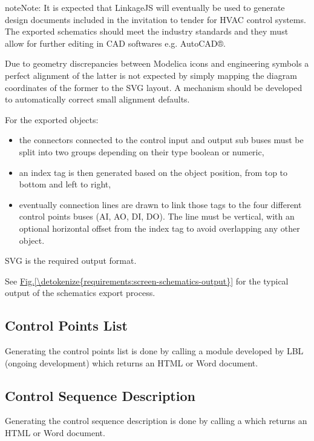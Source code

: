 \documentclass[letterpaper,10pt, openany,english]{sphinxmanual}
\begin{document}
\begin{sphinxadmonition}{note}{Note:}
It is expected that LinkageJS will eventually be used to generate design documents included in the invitation to tender for HVAC control systems. The exported schematics should meet the industry standards and they must allow for further editing in CAD softwares e.g. AutoCAD®.

Due to geometry discrepancies between Modelica icons and engineering symbols a perfect alignment of the latter is not expected by simply mapping the diagram coordinates of the former to the SVG layout. A mechanism should be developed to automatically correct small alignment defaults.
\end{sphinxadmonition}

For the exported objects:
\begin{itemize}
\item {} 
the connectors connected to the control input and output sub buses must be split into two groups depending on their type \textendash{} boolean or numeric,

\item {} 
an index tag is then generated based on the object position, from top to bottom and left to right,

\item {} 
eventually connection lines are drawn to link those tags to the four different control points buses (AI, AO, DI, DO). The line must be vertical, with an optional horizontal offset from the index tag to avoid overlapping any other object.

\end{itemize}

SVG is the required output format.

See \hyperref[\detokenize{requirements:screen-schematics-output}]{Fig.\@ \ref{\detokenize{requirements:screen-schematics-output}}} for the typical output of the schematics export process.


\subsection{Control Points List}
\label{\detokenize{requirements:control-points-list}}
Generating the control points list is done by calling a module developed by LBL (ongoing development) which returns an HTML or Word document.


\subsection{Control Sequence Description}
\label{\detokenize{requirements:control-sequence-description}}
Generating the control sequence description is done by calling a  which returns an HTML or Word document.
\end{document}
